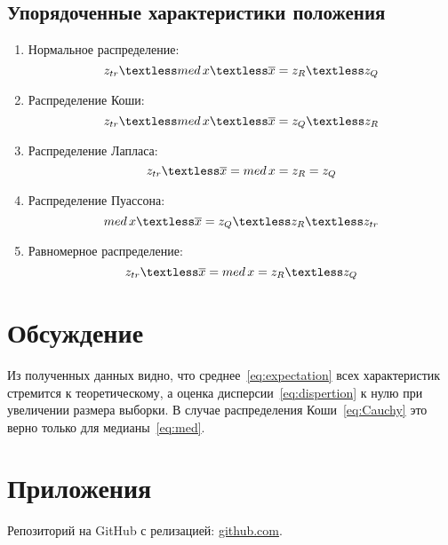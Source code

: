 \documentclass[12pt,a4paper]{scrartcl}
\begin{document}
\subsection{Упорядоченные характеристики положения}
\begin{enumerate}
\item Нормальное распределение:
\begin{equation}
\centering
z_{tr} \textless med \, x \textless \overline x= z_R \textless z_Q
\end{equation}

\item Распределение Коши:
\begin{equation}
\centering
z_{tr} \textless med \, x \textless \overline x = z_Q \textless z_R
\end{equation}

\item Распределение Лапласа:
\begin{equation}
\centering
z_{tr} \textless \overline x = med \, x = z_R = z_Q
\end{equation}

\item Распределение Пуассона:
\begin{equation}
\centering
med \, x \textless \overline x = z_Q \textless z_R \textless z_{tr}
\end{equation}

\item Равномерное распределение:
\begin{equation}
\centering
z_{tr} \textless \overline x = med \, x = z_R \textless z_Q
\end{equation}
\end{enumerate}



\section{Обсуждение}
Из полученных данных видно, что среднее~\eqref{eq:expectation} всех характеристик стремится к теоретическому, а оценка дисперсии~\eqref{eq:dispertion} к нулю при увеличении размера выборки. В случае распределения Коши~\eqref{eq:Cauchy} это верно только для медианы~\eqref{eq:med}.

\section{Приложения}
Репозиторий на GitHub с релизацией: \href{https://github.com/WiillyWonka/MatStat}{github.com}.
\end{document}
